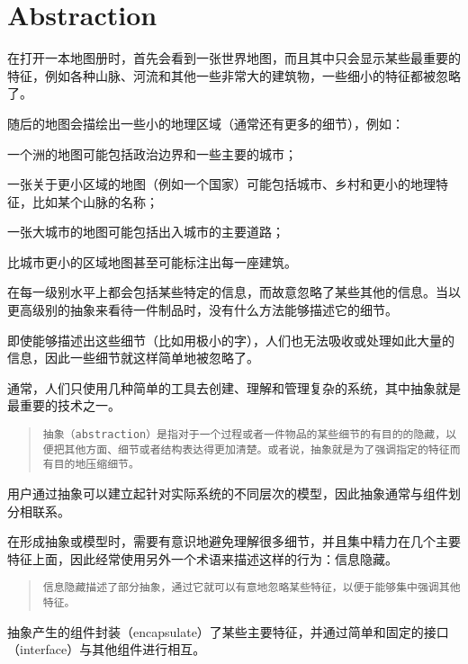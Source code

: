 \chapter{Abstraction}

在打开一本地图册时，首先会看到一张世界地图，而且其中只会显示某些最重要的特征，例如各种山脉、河流和其他一些非常大的建筑物，一些细小的特征都被忽略了。

随后的地图会描绘出一些小的地理区域（通常还有更多的细节），例如：

\begin{compactitem}
\item 一个洲的地图可能包括政治边界和一些主要的城市；
\item 一张关于更小区域的地图（例如一个国家）可能包括城市、乡村和更小的地理特征，比如某个山脉的名称；
\item 一张大城市的地图可能包括出入城市的主要道路；
\item 比城市更小的区域地图甚至可能标注出每一座建筑。
\end{compactitem}

在每一级别水平上都会包括某些特定的信息，而故意忽略了某些其他的信息。当以更高级别的抽象来看待一件制品时，没有什么方法能够描述它的细节。

即使能够描述出这些细节（比如用极小的字），人们也无法吸收或处理如此大量的信息，因此一些细节就这样简单地被忽略了。

通常，人们只使用几种简单的工具去创建、理解和管理复杂的系统，其中抽象就是最重要的技术之一。

\begin{quote}
\texttt{抽象（abstraction）是指对于一个过程或者一件物品的某些细节的有目的的隐藏，以便把其他方面、细节或者结构表达得更加清楚。或者说，抽象就是为了强调指定的特征而有目的地压缩细节。}
\end{quote}



用户通过抽象可以建立起针对实际系统的不同层次的模型，因此抽象通常与组件划分相联系。

在形成抽象或模型时，需要有意识地避免理解很多细节，并且集中精力在几个主要特征上面，因此经常使用另外一个术语来描述这样的行为：信息隐藏。

\begin{quote}
\texttt{信息隐藏描述了部分抽象，通过它就可以有意地忽略某些特征，以便于能够集中强调其他特征。}
\end{quote}

抽象产生的组件封装（encapsulate）了某些主要特征，并通过简单和固定的接口（interface）与其他组件进行相互。

